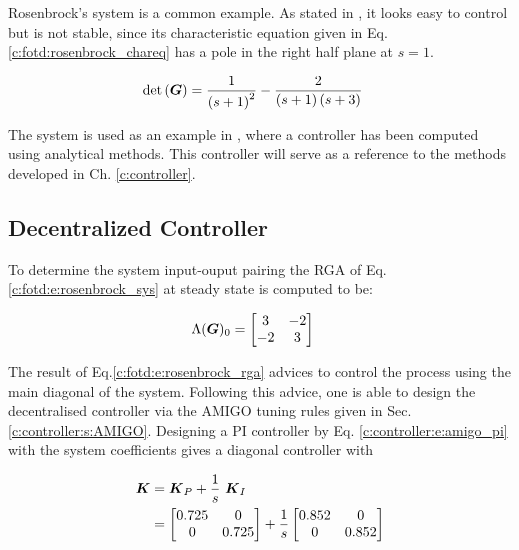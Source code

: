 Rosenbrock's system is a common example. As stated in \cite{Astrom2001a}, it looks easy to control but is not stable, since its characteristic equation given in Eq. \ref{c:fotd:rosenbrock_chareq} has a pole in the right half plane at $s=1$.

\begin{align}
\begin{split}
\det\left( \mbox{\boldmath$G$} \right) &= \frac{1}{\left( s + 1\right)^2} - \frac{2}{\left( s + 1\right) \left( s + 3\right)}
\end{split}
\label{c:fotd:rosenbrock_chareq}
\end{align}

The system is used as an example in \cite{Astrom2001a}, where a controller has been computed using analytical methods. This controller will serve as a reference to the methods developed in Ch. \ref{c:controller}. 

\subsection{Decentralized Controller}%
\label{c:fotd:s:rosebrock:sub:decentral}

To determine the system input-ouput pairing the RGA of Eq.\ref{c:fotd:e:rosenbrock_sys} at steady state is computed to be:

\begin{align}
\begin{split}
\Lambda(\mbox{\boldmath$G$})_0 &= \begin{bmatrix}
3 & -2 \\
-2 & 3
\end{bmatrix} 
\end{split}
\label{c:fotd:e:rosenbrock_rga}
\end{align}

The result of Eq.\ref{c:fotd:e:rosenbrock_rga} advices to control the process using the main diagonal of the system. Following this advice, one is able to design the decentralised controller via the AMIGO tuning rules given in Sec. \ref{c:controller:s:AMIGO}. Designing a PI controller by Eq. \ref{c:controller:e:amigo_pi} with the system coefficients gives a diagonal controller with

\begin{align}
\mbox{\boldmath$K$} &= \mbox{\boldmath$K$}_P + \frac{1}{s}~ \mbox{\boldmath$K$}_I\\
&= \begin{bmatrix}
0.725 & 0 \\
0 & 0.725
\end{bmatrix}
+ \frac{1}{s}\begin{bmatrix}
0.852 & 0 \\
0 & 0.852
\end{bmatrix}
\end{align}

